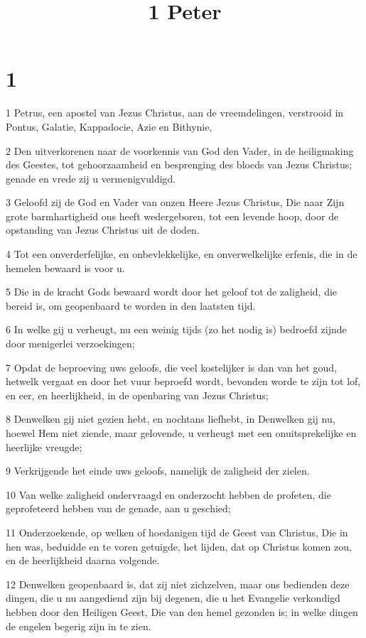 

\title{1 Peter}



\chapter{1}

\par 1 Petrus, een apostel van Jezus Christus, aan de vreemdelingen, verstrooid in Pontus, Galatie, Kappadocie, Azie en Bithynie,
\par 2 Den uitverkorenen naar de voorkennis van God den Vader, in de heiligmaking des Geestes, tot gehoorzaamheid en besprenging des bloeds van Jezus Christus; genade en vrede zij u vermenigvuldigd.
\par 3 Geloofd zij de God en Vader van onzen Heere Jezus Christus, Die naar Zijn grote barmhartigheid ons heeft wedergeboren, tot een levende hoop, door de opstanding van Jezus Christus uit de doden.
\par 4 Tot een onverderfelijke, en onbevlekkelijke, en onverwelkelijke erfenis, die in de hemelen bewaard is voor u.
\par 5 Die in de kracht Gods bewaard wordt door het geloof tot de zaligheid, die bereid is, om geopenbaard te worden in den laatsten tijd.
\par 6 In welke gij u verheugt, nu een weinig tijds (zo het nodig is) bedroefd zijnde door menigerlei verzoekingen;
\par 7 Opdat de beproeving uws geloofs, die veel kostelijker is dan van het goud, hetwelk vergaat en door het vuur beproefd wordt, bevonden worde te zijn tot lof, en eer, en heerlijkheid, in de openbaring van Jezus Christus;
\par 8 Denwelken gij niet gezien hebt, en nochtans liefhebt, in Denwelken gij nu, hoewel Hem niet ziende, maar gelovende, u verheugt met een onuitsprekelijke en heerlijke vreugde;
\par 9 Verkrijgende het einde uws geloofs, namelijk de zaligheid der zielen.
\par 10 Van welke zaligheid ondervraagd en onderzocht hebben de profeten, die geprofeteerd hebben van de genade, aan u geschied;
\par 11 Onderzoekende, op welken of hoedanigen tijd de Geest van Christus, Die in hen was, beduidde en te voren getuigde, het lijden, dat op Christus komen zou, en de heerlijkheid daarna volgende.
\par 12 Denwelken geopenbaard is, dat zij niet zichzelven, maar ons bedienden deze dingen, die u nu aangediend zijn bij degenen, die u het Evangelie verkondigd hebben door den Heiligen Geest, Die van den hemel gezonden is; in welke dingen de engelen begerig zijn in te zien.
